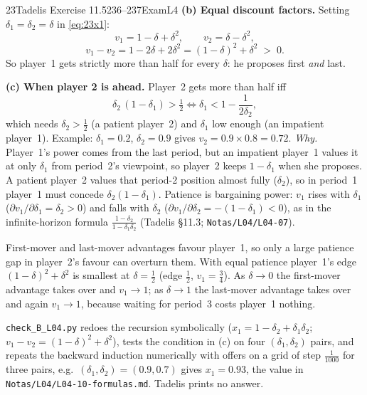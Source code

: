 \begin{exsol}{23}{Tadelis Exercise 11.5}{236--237}{Exam}{L4}
\textbf{(b) Equal discount factors.} Setting $\delta_1 = \delta_2 = \delta$ in \eqref{eq:23x1}:
\[
  v_1 = 1 - \delta + \delta^2, \qquad v_2 = \delta - \delta^2,
\]
\[
  v_1 - v_2 = 1 - 2\delta + 2\delta^2 = (1 - \delta)^2 + \delta^2 \;>\; 0 .
\]
So player~1 gets strictly more than half for every $\delta$: he proposes first \emph{and} last.

\textbf{(c) When player 2 is ahead.} Player~2 gets more than half iff
\[
  \delta_2\,(1 - \delta_1) > \tfrac12 \iff \delta_1 < 1 - \frac{1}{2\delta_2} ,
\]
which needs $\delta_2 > \frac12$ (a patient player~2) and $\delta_1$ low enough (an impatient
player~1). Example: $\delta_1 = 0.2$, $\delta_2 = 0.9$ gives $v_2 = 0.9 \times 0.8 = 0.72$.
\emph{Why.} Player~1's power comes from the last period, but an impatient player~1 values it at only
$\delta_1$ from period~2's viewpoint, so player~2 keeps $1 - \delta_1$ when she proposes. A patient
player~2 values that period-2 position almost fully ($\delta_2$), so in period~1 player~1 must
concede $\delta_2(1 - \delta_1)$. Patience is bargaining power: $v_1$ rises with $\delta_1$
($\partial v_1/\partial\delta_1 = \delta_2 > 0$) and falls with $\delta_2$
($\partial v_1/\partial \delta_2 = -(1 - \delta_1) < 0$), as in the infinite-horizon formula
$\frac{1 - \delta_2}{1 - \delta_1\delta_2}$ (Tadelis \S11.3; \texttt{Notas/L04/L04-07}).

\interp First-mover and last-mover advantages favour player~1, so only a large patience gap in
player~2's favour can overturn them. With equal patience player~1's edge $(1-\delta)^2 + \delta^2$
is smallest at $\delta = \frac12$ (edge $\frac12$, $v_1 = \frac34$). As $\delta \to 0$ the first-mover
advantage takes over and $v_1 \to 1$; as $\delta \to 1$ the last-mover advantage takes over and again
$v_1 \to 1$, because waiting for period~3 costs player~1 nothing.

\verify \texttt{check\_B\_L04.py} redoes the recursion symbolically ($x_1 = 1 - \delta_2 +
\delta_1\delta_2$; $v_1 - v_2 = (1-\delta)^2 + \delta^2$), tests the condition in (c) on four
$(\delta_1, \delta_2)$ pairs, and repeats the backward induction numerically with offers on a grid of
step $\frac1{1000}$ for three pairs, e.g.\ $(\delta_1,\delta_2) = (0.9, 0.7)$ gives $x_1 = 0.93$, the
value in \texttt{Notas/L04/L04-10-formulas.md}. Tadelis prints no answer.

\end{exsol}
